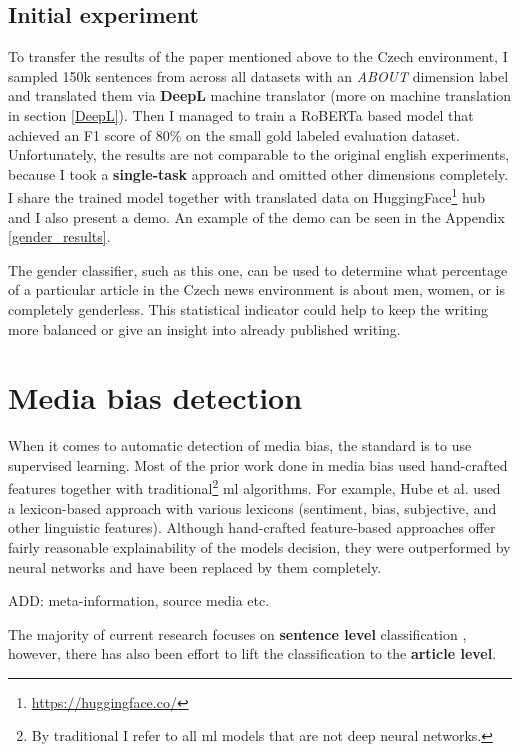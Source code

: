 \subsection{Initial experiment}
To transfer the results of the paper mentioned above to the Czech environment, I sampled 150k sentences from across all datasets with an \textit{ABOUT} dimension label and translated them via \textbf{DeepL} machine translator (more on machine translation in section \ref{DeepL}). Then I managed to train a RoBERTa based model that achieved an F1 score of 80\% on the small gold labeled evaluation dataset. 
Unfortunately, the results are not comparable to the original english experiments, because I took a \textbf{single-task} approach and omitted other dimensions completely. I share the trained model together with translated data on HuggingFace\footnote{\url{https://huggingface.co/}} hub and I also present a demo. An example of the demo can be seen in the Appendix \ref{gender_results}.

The gender classifier, such as this one, can be used to determine what percentage of a particular article in the Czech news environment is about men, women, or is completely genderless. This statistical indicator could help to keep the writing more balanced or give an insight into already published writing.





\section{Media bias detection}\label{mediabias}
When it comes to automatic detection of media bias, the standard is to use supervised learning. Most of the prior work done in media bias used hand-crafted features together with traditional\footnote{By traditional I refer to all \Gls{ml} models that are not deep neural networks.} \Gls{ml} algorithms. For example, Hube et al. \cite{hube2018detecting} used a lexicon-based approach with various lexicons (sentiment, bias, subjective, and other linguistic features). Although hand-crafted feature-based approaches offer fairly reasonable explainability of the models decision, they were outperformed by neural networks and have been replaced by them completely.


ADD: meta-information, source media etc.

The majority of current research focuses on \textbf{sentence level} classification \cite{sinha2021determining,Spinde2021MBIC,lee2021unifying,hube2019neural}, however, there has also been effort to lift the classification to the \textbf{article level}.

